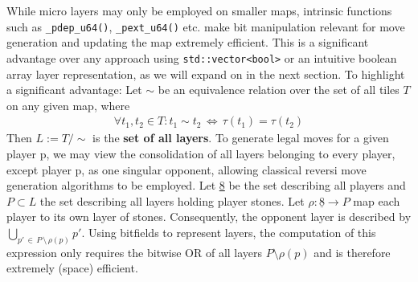 While micro layers may only be employed on smaller maps, intrinsic functions such as \texttt{\_pdep\_u64()}, \texttt{\_pext\_u64()} etc. make bit manipulation relevant for move generation and updating the map extremely efficient. This is a significant advantage over any approach using \texttt{std::vector<bool>} or an intuitive boolean array layer representation, as we will expand on in the next section. To highlight a significant advantage: Let \(\sim\) be an equivalence relation over the set of all tiles \(T\) on any given map, where 
\begin{align*}
	\forall t_1, t_2 \in T: t_1 \sim t_2 \, \Leftrightarrow \, \tau(t_1) = \tau(t_2)
\end{align*}
Then \(L := T/\sim\) is the \textbf{set of all layers}. To generate legal moves for a given player p, we may view the consolidation of all layers belonging to every player, except player p, as one singular opponent, allowing classical reversi move generation algorithms to be employed. Let \underline{8} be the set describing all players and \(P \subset L\) the set describing all layers holding player stones. Let \(\rho: \underline{8} \to P\) map each player to its own layer of stones.
Consequently, the opponent layer is described by \(\bigcup_{p'\,\in\,P\,\setminus\,\rho(p)} p'\). Using bitfields to represent layers, the computation of this expression only requires the bitwise OR of all layers \(P \setminus \rho(p)\) and is therefore extremely (space) efficient.\\
